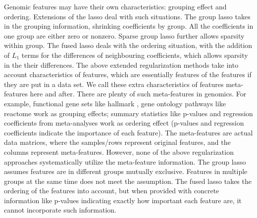 \documentclass[12pt]{article}
\begin{document}
Genomic features may have their own characteristics: grouping effect and ordering. Extensions of the lasso deal with such situations. The group lasso \citep{yuan2006model} takes in the grouping information, shrinking coefficients by group. All the coefficients in one group are either zero or nonzero. Sparse group lasso \citep{simon2013sparse} further allows sparsity within group. The fused lasso deals with the ordering situation, with the addition of $L_1$ terms for the differences of neighbouring coefficients, which allows sparsity in the their differences. The above extended regularization methods take into account characteristics of features, which are essentially features of the features if they are put in a data set. We call these extra characteristics of features meta-features here and after. There are plenty of such meta-features in genomics. For example, functional gene sets like hallmark \citep{liberzon2015molecular}, gene ontology pathways like reactome \citep{jassal2020reactome} work as grouping effects; summary statistics like p-values and regression coefficients from meta-analyses work as ordering effect (p-values and regression coefficients indicate the importance of each feature). The meta-features are actual data matrices, where the samples/rows represent original features, and the columns represent meta-features. However, none of the above regularization approaches systematically utilize the meta-feature information. The group lasso assumes features are in different groups mutually exclusive. Features in multiple groups at the same time does not meet the assumption. The fused lasso takes the ordering of the features into account, but when provided with concrete information like p-values indicating exactly how important each feature are, it cannot incorporate such information. 
\end{document}
